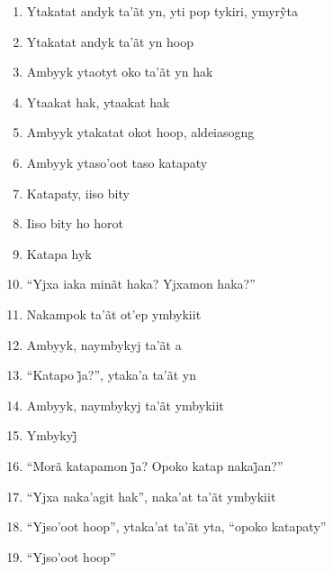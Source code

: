 \begin{enumerate}
 \item Ytakatat andyk ta’ãt yn, yti pop tykiri, ymyrỹta

 \item Ytakatat andyk ta'ãt yn hoop

 \item Ambyyk ytaotyt oko ta'ãt yn hak

 \item Ytaakat hak, ytaakat hak

 \begin{center}\end{center}

 \item Ambyyk ytakatat okot hoop, aldeiasogng

 \item Ambyyk ytaso'oot taso katapaty

 \item Katapaty, iiso bity

 \item Iiso bity ho horot

 \item Katapa hyk

 \item ``Yjxa iaka minãt haka? Yjxamon haka?''

 \begin{center}\end{center}

 \item Nakampok ta'ãt ot'ep ymbykiit

 \item Ambyyk, naymbykyj ta'ãt a

 \item ``Katapo j̃a?'', ytaka’a ta’ãt yn

 \item Ambyyk, naymbykyj ta'ãt ymbykiit

 \item Ymbykyj̃

 \item ``Morã katapamon j̃a? Opoko katap nakaj̃an?''

 \item ``Yjxa naka'agit hak'', naka'at ta'ãt ymbykiit

 \item ``Yjso'oot hoop'', ytaka'at ta'ãt yta, ``opoko katapaty''

 \item ``Yjso'oot hoop''


\end{enumerate}
